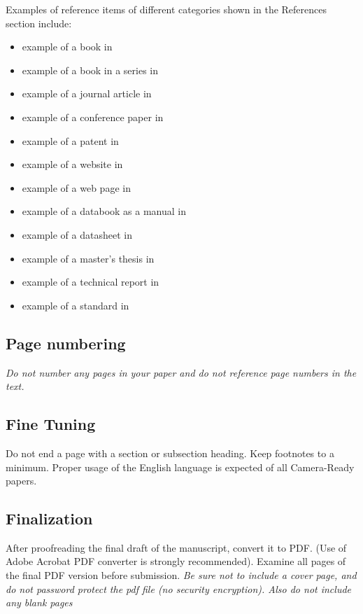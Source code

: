 \documentclass[conference]{worldcomp}
\begin{document}
Examples of reference items of different categories shown in the
References section include:

\begin{itemize}
\item example of a book in \cite{IEEEexample:book}
\item example of a book in a series in \cite{IEEEexample:bookwithseriesvolume}
\item example of a journal article in \cite{IEEEexample:article_typical}
\item example of a conference paper in \cite{IEEEexample:confwithpaper}
\item example of a patent in \cite{IEEEexample:uspat}
\item example of a website in \cite{IEEEexample:IEEEwebsite}
\item example of a web page in \cite{IEEEexample:shellCTANpage}
\item example of a databook as a manual in \cite{IEEEexample:motmanual}
\item example of a datasheet in \cite{IEEEexample:datasheet}
\item example of a master's thesis in \cite{IEEEexample:masterstype}
\item example of a technical report in \cite{IEEEexample:techreptype}
\item example of a standard in \cite{IEEEexample:standard}
\end{itemize}

\subsection{Page numbering}
{\em Do not number any pages in your paper and do not reference page numbers in the text.}

\subsection{Fine Tuning}
Do not end a page with a section or subsection heading. Keep footnotes to a minimum. 
Proper usage of the English language is expected of all Camera-Ready papers.

\subsection{Finalization}
After proofreading the final draft of the manuscript, convert it to PDF.  (Use of 
Adobe Acrobat PDF converter is strongly recommended). Examine all pages of the 
final PDF version before submission. {\em Be sure not to include a cover page, and do 
not password protect the pdf file (no security encryption). Also do not include any blank pages}
\end{document}
